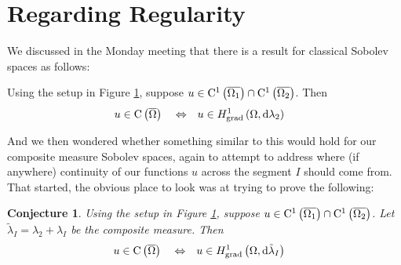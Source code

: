 \documentclass[11pt]{report}
\newtheorem{conj}[theorem]{Conjecture}
\theoremstyle{plain}
\newcommand{\tlambda}{\tilde{\lambda}}
\newcommand{\C}[1]{\mathrm{C}^1\bracs{#1}}
\begin{document}
\section*{Regarding Regularity}

We discussed in the Monday meeting that there is a result for classical Sobolev spaces as follows:
\begin{theorem} \label{thm:MeetingThm}
	Using the setup in Figure \ref{fig:MeetingSituation}, suppose $u\in \C{\overline{\ddom_1}}\cap \C{\overline{\ddom_2}}$.
	Then
	\begin{align*}
		u\in\mathrm{C}\left( \overline{\Omega} \right) \quad\Leftrightarrow\quad & u\in H^1_\mathrm{grad}\left( \Omega, \mathrm{d}\lambda_2 \right)
	\end{align*}
\end{theorem}
\begin{figure}[h!]
	\centering
	\caption{\label{fig:MeetingSituation}}
\end{figure}
And we then wondered whether something similar to this would hold for our composite measure Sobolev spaces, again to attempt to address where (if anywhere) continuity of our functions $u$ across the segment $I$ should come from.
That started, the obvious place to look was at trying to prove the following:
\begin{conj} \label{conj:CompMeasRegularity}
	Using the setup in Figure \ref{fig:MeetingSituation}, suppose $u\in \C{\overline{\ddom_1}}\cap \C{\overline{\ddom_2}}$.
	Let $\tlambda_I = \lambda_2 + \lambda_I$ be the composite measure.
	Then
	\begin{align*}
		u\in\mathrm{C}\bracs{\overline{\ddom}} \quad\Leftrightarrow\quad & u\in\gradSob{\ddom}{\tlambda_I}
	\end{align*}
\end{conj}
\end{document}
